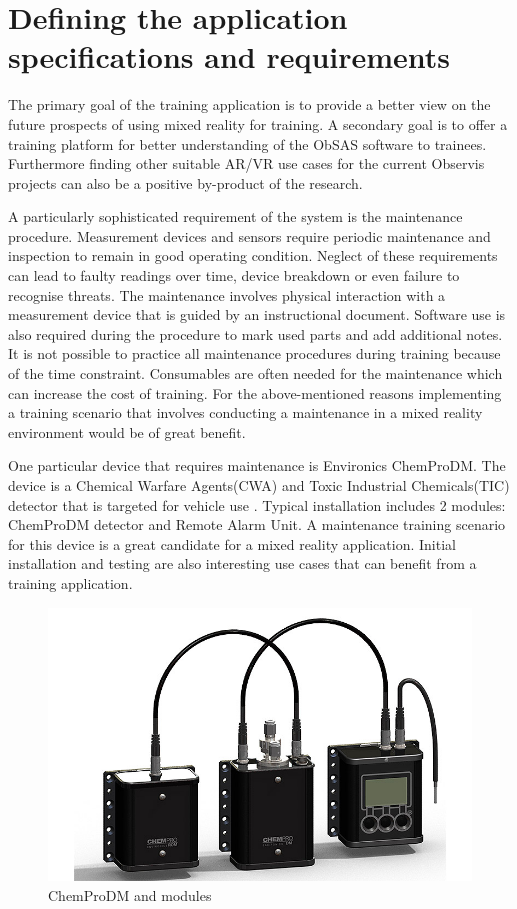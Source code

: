 \documentclass[12pt, a4paper,oneside, nocenter]{thesis}
\begin{document}
\section{Defining the application specifications and requirements}
The primary goal of the training application is to provide a better view on the future prospects of using mixed reality for training. A secondary goal is to offer a training platform for better understanding of the ObSAS software to trainees. Furthermore finding other suitable AR/VR use cases for the current Observis projects can also be a positive by-product of the research.
\par
A particularly sophisticated requirement of the system is the maintenance procedure. Measurement devices and sensors require periodic maintenance and inspection to remain in good operating condition. Neglect of these requirements can lead to faulty readings over time, device breakdown or even failure to recognise threats. The maintenance involves physical interaction with a measurement device that is guided by an instructional document. Software use is also required during the procedure to mark used parts and add additional notes. It is not possible to practice all maintenance procedures during training because of the time constraint. Consumables are often needed for the maintenance which can increase the cost of training. For the above-mentioned reasons implementing a training scenario that involves conducting a maintenance in a mixed reality environment would be of great benefit.
\par
One particular device that requires maintenance is Environics ChemProDM. The device is a Chemical Warfare Agents(CWA) and Toxic Industrial Chemicals(TIC) detector that is targeted for vehicle use . Typical installation includes 2 modules: ChemProDM detector and Remote Alarm Unit. A maintenance training scenario for this device is a great candidate for a mixed reality application. Initial installation and testing are also interesting use cases that can benefit from a training application.
\begin{figure}[H]
	\includegraphics[width=\textwidth]{chemprodm}
	\caption{ChemProDM and modules \citeyearpar{environics-chemprodm}}
	\label{fig:chemprodm}
\end{figure}
\end{document}
